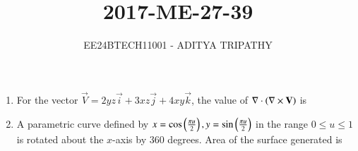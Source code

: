\documentclass[journal,12pt,onecolumn]{IEEEtran}
\theoremstyle{remark}
\begin{document}

\vspace{3cm}

\title{2017-ME-27-39}
\author{EE24BTECH11001 -  ADITYA TRIPATHY}
\maketitle

\renewcommand{\thefigure}{\theenumi}
\renewcommand{\thetable}{\theenumi}

\begin{enumerate}
    \item 
        For the vector $\vec{V} = 2yz\vec{i} + 3xz\vec{j} + 4xy\vec{k}$, the value of 
        $\nabla \cdot \left(\nabla \times \mathbf{V}\right)$ is 
        \hfill{}
\\
    \item A parametric curve defined by $x = \cos\left(\frac{\pi u}{2}\right), y = \sin\left(\frac{\pi u}{2}\right)$ 
        in the range $0 \le u \le 1$ is rotated about the $x$-axis by 360 degrees. Area of the surface 
        generated is


\end{enumerate}
\end{document}
